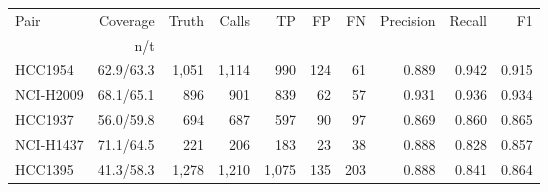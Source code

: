 \begin{tabular}{lrrrrrrrrr}
\toprule
Pair & Coverage & Truth & Calls & TP & FP & FN & Precision & Recall & F1 \\
     & n/t      &       &       &    &    &    &           &        &    \\
\midrule
HCC1954 & 62.9/63.3 & 1,051 & 1,114 & 990 & 124 & 61 & 0.889 & 0.942 & 0.915 \\
NCI-H2009 & 68.1/65.1 & 896 & 901 & 839 & 62 & 57 & 0.931 & 0.936 & 0.934 \\
HCC1937 & 56.0/59.8 & 694 & 687 & 597 & 90 & 97 & 0.869 & 0.860 & 0.865 \\
NCI-H1437 & 71.1/64.5 & 221 & 206 & 183 & 23 & 38 & 0.888 & 0.828 & 0.857 \\
HCC1395 & 41.3/58.3 & 1,278 & 1,210 & 1,075 & 135 & 203 & 0.888 & 0.841 & 0.864 \\
\bottomrule
\end{tabular}
